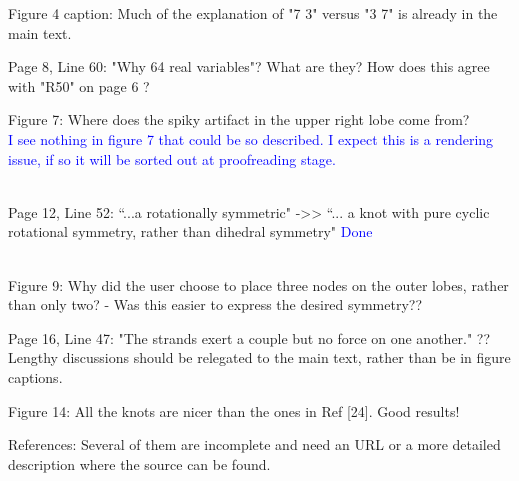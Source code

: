 \documentclass[12pt]{article}
\begin{document}
Figure 4 caption: Much of the explanation of "7 3" versus "3 7" is
already in the main text.

Page 8, Line 60: "Why 64 real variables"?  What are they?  How does
this agree with "R50" on page 6 ?

Figure 7: Where does the spiky artifact in the upper right lobe come
from?  \textcolor{blue}{\\I see nothing in figure 7 that could be so
  described.  I expect this is a rendering issue, if so it will be
  sorted out at proofreading stage.\\ \\}


Page 12, Line 52: ``...a rotationally symmetric" ->> ``... a knot with
pure cyclic rotational symmetry, rather than dihedral symmetry"
  \textcolor{blue}{Done\\ \\}




Figure 9: Why did the user choose to place three nodes on the outer
lobes, rather than only two? - Was this easier to express the desired
symmetry??

Page 16, Line 47: "The strands exert a couple but no force on one
another." ??  Lengthy discussions should be relegated to the main
text, rather than be in figure captions.

Figure 14: All the knots are nicer than the ones in Ref [24].  Good
results!

References: Several of them are incomplete and need an URL or a more
detailed description where the source can be found.
\end{document}
